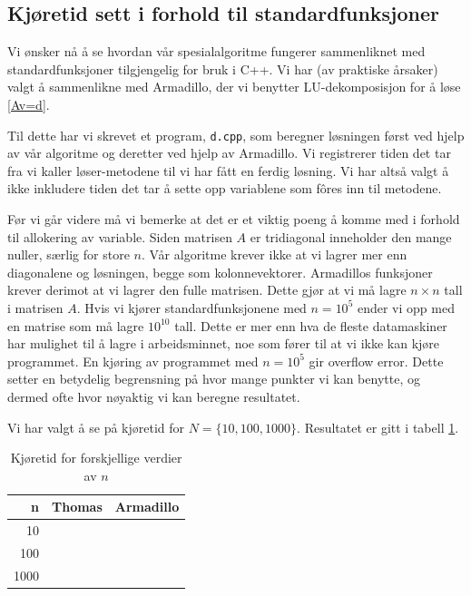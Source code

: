 \documentclass[11pt]{article}
\begin{document}
\subsection{Kjøretid sett i forhold til standardfunksjoner}
Vi ønsker nå å se hvordan vår spesialalgoritme fungerer sammenliknet
med standardfunksjoner tilgjengelig for bruk i C++. Vi har (av
praktiske årsaker) valgt å sammenlikne med Armadillo, der vi benytter
LU-dekomposisjon for å løse \eqref{Av=d}. 

Til dette har vi skrevet et program, \texttt{d.cpp}, som beregner
løsningen først ved hjelp av vår algoritme og deretter ved hjelp av
Armadillo. Vi registrerer tiden det tar fra vi kaller løser-metodene
til vi har fått en ferdig løsning. Vi har altså valgt å ikke inkludere
tiden det tar å sette opp variablene som fôres inn til metodene. 

Før vi går videre må vi bemerke at det er et viktig poeng å komme med
i forhold til allokering av variable. Siden matrisen $A$ er
tridiagonal inneholder den mange nuller, særlig for store $n$. Vår
algoritme krever ikke at vi lagrer mer enn diagonalene og løsningen,
begge som kolonnevektorer. Armadillos funksjoner krever derimot at vi
lagrer den fulle matrisen. Dette gjør at vi må lagre $n\times n$ tall
i matrisen $A$. Hvis vi kjører standardfunksjonene med $n=10^5$ ender
vi opp med en matrise som må lagre $10^{10}$ tall. Dette er mer enn
hva de fleste datamaskiner har mulighet til å lagre i arbeidsminnet,
noe som fører til at vi ikke kan kjøre programmet. En kjøring av programmet med
$n=10^5$ gir overflow error. Dette setter en
betydelig begrensning på hvor mange punkter vi kan benytte, og dermed
ofte hvor nøyaktig vi kan beregne resultatet.

Vi har valgt å se på kjøretid for $N = \{10, 100, 1000\}$. Resultatet
er gitt i tabell \ref{tab:1}.
\begin{table}[h]
\centering
\caption{Kjøretid for forskjellige verdier av $n$}
\label{tab:1}
\vspace{0.1cm}
\begin{tabular}{rll}
n & Thomas & Armadillo \\
\hline
10 &  &  \\
100 &  &  \\
1000 &  &  \\
\end{tabular}
\end{table}
\end{document}
